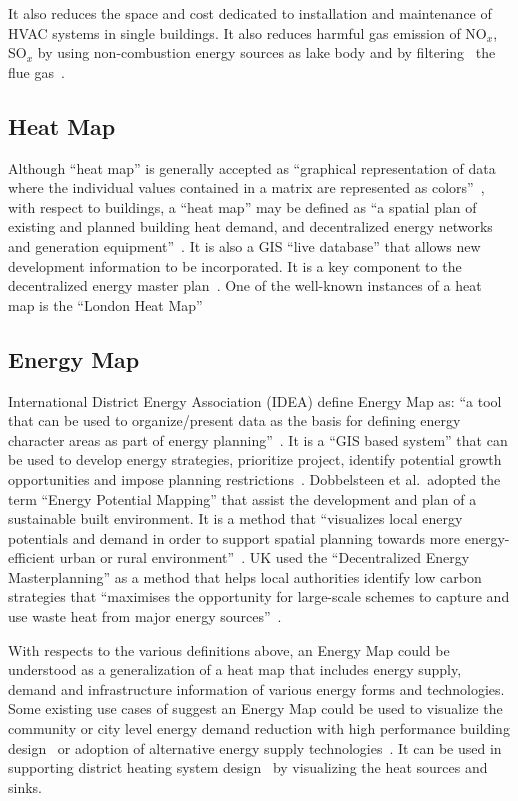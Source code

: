 It also reduces the space and cost dedicated to installation and
maintenance of HVAC systems in single buildings. It also reduces
harmful gas emission of NO$_x$, SO$_x$ by using non-combustion energy
sources as lake body and by filtering~\cite{IDEA2012} the flue gas~\cite{veolia2014}.

\subsection{Heat Map}
Although ``heat map'' is generally accepted as ``graphical
representation of data where the individual values contained in a
matrix are represented as colors''~\cite{HeatmapWiki}, with respect to
buildings, a ``heat map'' may be defined as ``a spatial plan of
existing and planned building heat demand, and decentralized energy
networks and generation equipment''~\cite{decentralHeatMap2011}. It is
also a GIS ``live database'' that allows new development information
to be incorporated. It is a key component to the decentralized energy
master plan~\cite{decentralHeatMap2011}. One of the well-known
instances of a heat map is the ``London Heat
Map''~\cite{londonHeatMap}

\subsection{Energy Map}
International District Energy Association (IDEA) define Energy Map as:
``a tool that can be used to organize/present data as the basis for
defining energy character areas as part of energy
planning''~\cite{IDEA2012}. It is a ``GIS based system'' that can be
used to develop energy strategies, prioritize project, identify
potential growth opportunities and impose planning
restrictions~\cite{IDEA2012}. Dobbelsteen et al.\ adopted the term
``Energy Potential Mapping'' that assist the development and plan of a
sustainable built environment. It is a method that ``visualizes local
energy potentials and demand in order to support spatial planning
towards more energy-efficient urban or rural
environment''~\cite{Dobbelsteen2013}. UK used the ``Decentralized
Energy Masterplanning'' as a method that helps local authorities
identify low carbon strategies that ``maximises the opportunity for
large-scale schemes to capture and use waste heat from major energy
sources''~\cite{decentralHeatMap2011}.

With respects to the various definitions above, an Energy Map could be
understood as a generalization of a heat map that includes energy
supply, demand and infrastructure information of various energy forms
and technologies. Some existing use cases of suggest an Energy Map
could be used to visualize the community or city level energy demand
reduction with high performance building design~\cite{aacip2009} or
adoption of alternative energy supply
technologies~\cite{aacip2009}. It can be used in supporting district
heating system design~\cite{decentralHeatMap2011, Finney2012165} by
visualizing the heat sources and sinks.

